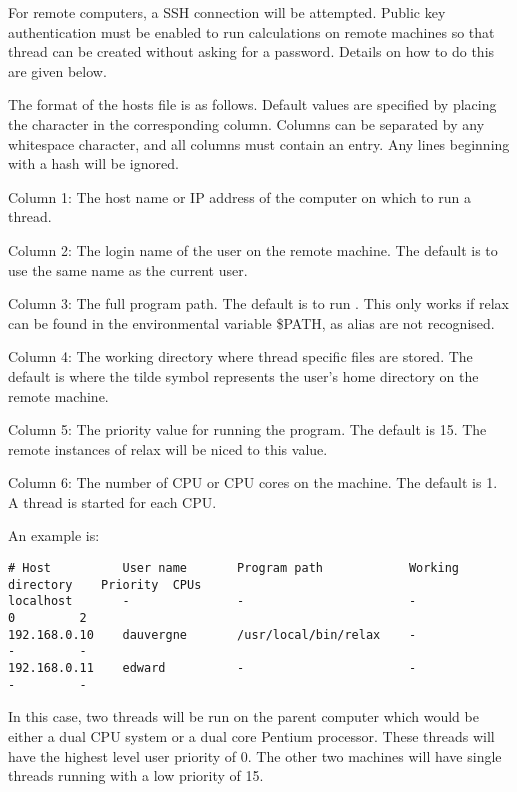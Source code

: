 For remote computers, a SSH connection will be attempted.  Public key authentication must be enabled to run calculations on remote machines so that thread can be created without asking for a password.  Details on how to do this are given below.


The format of the hosts file is as follows.  Default values are specified by placing the character \quotecmd{-} in the corresponding column.  Columns can be separated by any whitespace character, and all columns must contain an entry.  Any lines beginning with a hash will be ignored.


Column 1:  The host name or IP address of the computer on which to run a thread.


Column 2:  The login name of the user on the remote machine.  The default is to use the same name as the current user.


Column 3:  The full program path.  The default is to run .  This only works if relax can be found in the environmental variable \$PATH, as alias are not recognised.


Column 4:  The working directory where thread specific files are stored.  The default is  where the tilde \quotecmd{\~{}} symbol represents the user's home directory on the remote machine.


Column 5:  The priority value for running the program.  The default is 15.  The remote instances of relax will be niced to this value.


Column 6:  The number of CPU or CPU cores on the machine.  The default is 1.  A thread is started for each CPU.


An example is:


{\footnotesize \begin{verbatim}
# Host          User name       Program path            Working directory    Priority  CPUs
localhost       -               -                       -                    0         2
192.168.0.10    dauvergne       /usr/local/bin/relax    -                    -         -
192.168.0.11    edward          -                       -                    -         -
\end{verbatim}}

In this case, two threads will be run on the parent computer which would be either a dual CPU system or a dual core  Pentium processor.  These threads will have the highest level user priority of 0.  The other two machines will have single threads running with a low priority of 15.



